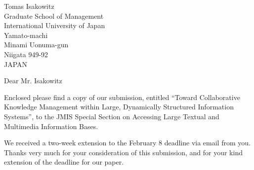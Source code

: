 

\makelabels


\signature {Philip Johnson}

\address{548 Kaimake Loop\\
         Kailua, HI 96734}
\indentclosing

\begin {letter}
  {Tomas Isakowitz\\
  Graduate School of Management\\
  International University of Japan\\
  Yamato-machi\\
  Minami Uonuma-gun\\
  Niigata 949-92\\
  JAPAN}

\opening {Dear Mr. Isakowitz}

Enclosed please find a copy of our submission, entitled ``Toward Collaborative
Knowledge Management within Large, Dynamically Structured Information
Systems'', to the JMIS Special Section on Accessing Large Textual and
Multimedia Information Bases.

We received a two-week extension to the February 8 deadline via email from you.
Thanks very much for your consideration of this submission, and for your kind
extension of the deadline for our paper.

\end{letter}

